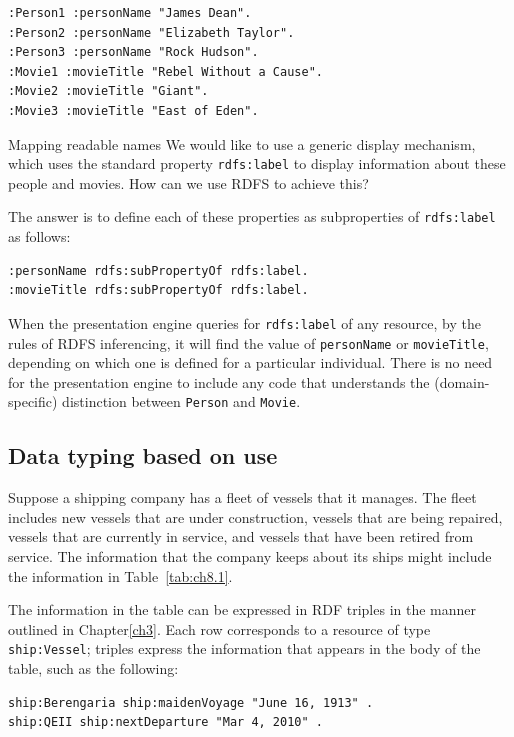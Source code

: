 \begin{lstlisting}
:Person1 :personName "James Dean".
:Person2 :personName "Elizabeth Taylor".
:Person3 :personName "Rock Hudson".
:Movie1 :movieTitle "Rebel Without a Cause".
:Movie2 :movieTitle "Giant".
:Movie3 :movieTitle "East of Eden".
\end{lstlisting}

\begin{challenge}{Mapping readable names}
\label{chal:9}
We would like to use a generic display mechanism, which uses the
standard property \texttt{rdfs:label} to display information about these people
and movies. How can we use RDFS to achieve this?

\solution

The answer is to define each of these properties as subproperties of
\texttt{rdfs:label} as follows:

\begin{lstlisting}
:personName rdfs:subPropertyOf rdfs:label.
:movieTitle rdfs:subPropertyOf rdfs:label.
\end{lstlisting}

When the presentation engine queries for \texttt{rdfs:label} of any resource, by
the rules of RDFS inferencing, it will find the value of \texttt{personName} or
\texttt{movieTitle}, depending on which one is defined for a particular
individual. There is no need for the presentation engine to include any
code that understands the (domain-specific) distinction between \texttt{Person}
and \texttt{Movie}.
\end{challenge}

\subsection{Data typing based on use}

Suppose a shipping company has a fleet of vessels that it manages. The
fleet includes new vessels that are under construction, vessels that are
being repaired, vessels that are currently in service, and vessels that
have been retired from service. The information that the company keeps
about its ships might include the information in Table~\ref{tab:ch8.1}.

The information in the table can be expressed in RDF triples in the
manner outlined in Chapter\ref{ch3}. Each row corresponds to a resource of type
\texttt{ship:Vessel}; triples express the information that appears in the body of
the table, such as the following:

\begin{lstlisting}
ship:Berengaria ship:maidenVoyage "June 16, 1913" .
ship:QEII ship:nextDeparture "Mar 4, 2010" .
\end{lstlisting}


